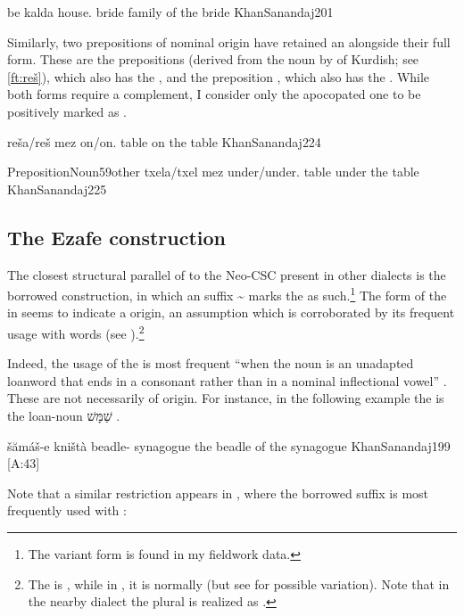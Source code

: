 {be\cb{} kalda}
{house.\cst\cb{} bride}
{family of the bride}
{KhanSanandaj}{201}

Similarly, two prepositions of nominal origin have retained an  alongside their full form. These are the prepositions  (derived from the noun  by  of Kurdish; see \vref{ft:reš}), which also has the  , and the preposition , which also has the  . While both forms require a complement, I consider only the apocopated one to be positively marked as \cst*.

\largerpage
{}
{reša/reš mez}
{on/on.\cst{} table}
{on the table}
{KhanSanandaj}{224}\antipar

\acex
{Preposition}{Noun}{59other}
{txela/txel mez}
{under/under.\cst{} table}
{under the table}
{KhanSanandaj}{225}\antipar
\newpage

\subsection{The Ezafe construction} \label{ss:JSan_Ez}

The closest structural parallel of \JSan to the Neo-CSC present in other dialects is the borrowed \ez* construction, in which an \ez* suffix \~ marks the \prim as such.\footnote{The  variant form  is found in my  fieldwork data.} The form of the \ez* in \JSan seems to indicate a \Per origin, an assumption which is corroborated by its frequent usage with \Per words (see ).\footnote{The \Per \ez* is , while in \Sor, it is normally  (but see  for possible variation). Note that in the nearby \Hawr dialect the plural \ez* is realized as  \citep[133]{HolmbergOdden}.}

Indeed, the usage of the \ez* is most frequent \enquote{when the noun is an unadapted  loanword that ends in a consonant rather than in a nominal inflectional vowel} \citep[199]{KhanSanandaj}. These  are not necessarily of  origin. For instance, in the following example the \prim is the \MishHeb loan-noun \texthebrew{שַׁמָּשׁ} .  

{šămáš-e kništà}
{beadle-\ez{} synagogue}
{the beadle of the synagogue}
{KhanSanandaj}{199 {[A:43]}}

Note that a similar restriction appears in \JSul, where the \Sor borrowed \ez* suffix  is most frequently used with  \citep[192f.]{KhanSulemaniyya}:


